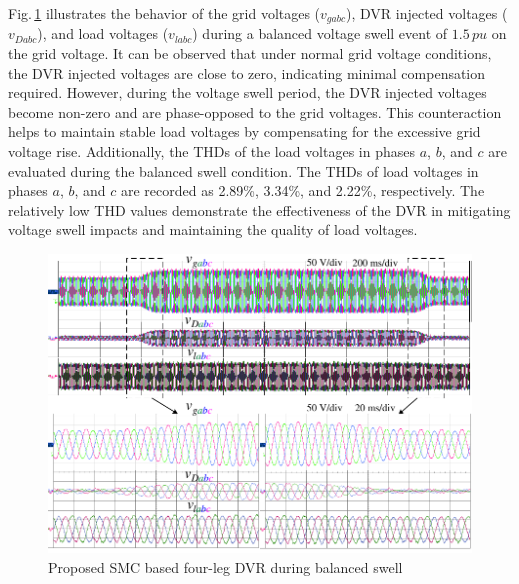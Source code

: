 Fig.\,\ref{5.BalSwell} illustrates the behavior of the grid voltages ($v_{gabc}$), DVR injected voltages ($v_{Dabc}$), and load voltages ($v_{labc}$) during a balanced voltage swell event of $1.5\,\si{pu}$ on the grid voltage. It can be observed that under normal grid voltage conditions, the DVR injected voltages are close to zero, indicating minimal compensation required. However, during the voltage swell period, the DVR injected voltages become non-zero and are phase-opposed to the grid voltages. This counteraction helps to maintain stable load voltages by compensating for the excessive grid voltage rise.
Additionally, the THDs of the load voltages in phases $a$, $b$, and $c$ are evaluated during the balanced swell condition. The THDs of load voltages in phases $a$, $b$, and $c$ are recorded as 2.89\%, 3.34\%, and 2.22\%, respectively. The relatively low THD values demonstrate the effectiveness of the DVR in mitigating voltage swell impacts and maintaining the quality of load voltages.
\begin{figure}[t!] %
	\centering
	\includegraphics[scale=1]{figures/Chapter_5/Mine/BalancedSwell_No_IL}
	\caption{Proposed SMC based four-leg DVR during balanced swell}  
	\label{5.BalSwell}
\end{figure} 
